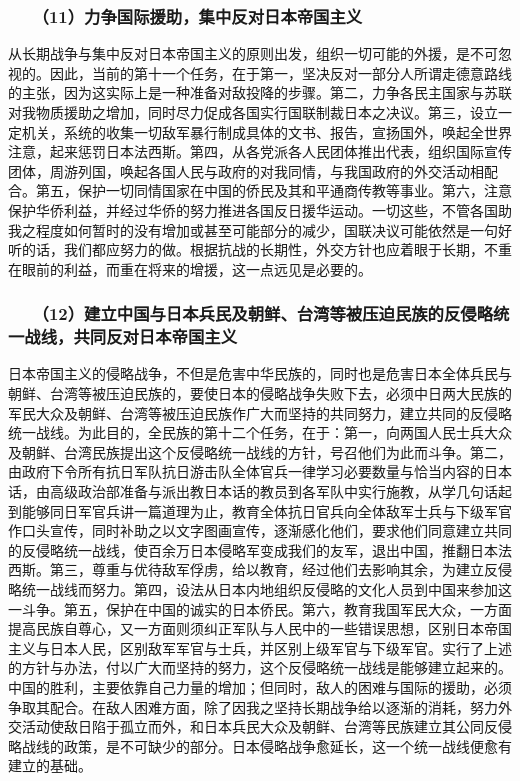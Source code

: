\documentclass[cn,11pt,chinese]{elegantbook}
\def\myformat#1{\hfil\hfil #1}
\begin{document}
\subsubsection*{\myformat{　　（11）力争国际援助，集中反对日本帝国主义}}
从长期战争与集中反对日本帝国主义的原则出发，组织一切可能的外援，是不可忽视的。因此，当前的第十一个任务，在于第一，坚决反对一部分人所谓走德意路线的主张，因为这实际上是一种准备对敌投降的步骤。第二，力争各民主国家与苏联对我物质援助之增加，同时尽力促成各国实行国联制裁日本之决议。第三，设立一定机关，系统的收集一切敌军暴行制成具体的文书、报告，宣扬国外，唤起全世界注意，起来惩罚日本法西斯。第四，从各党派各人民团体推出代表，组织国际宣传团体，周游列国，唤起各国人民与政府的对我同情，与我国政府的外交活动相配合。第五，保护一切同情国家在中国的侨民及其和平通商传教等事业。第六，注意保护华侨利益，并经过华侨的努力推进各国反日援华运动。一切这些，不管各国助我之程度如何暂时的没有增加或甚至可能部分的减少，国联决议可能依然是一句好听的话，我们都应努力的做。根据抗战的长期性，外交方针也应着眼于长期，不重在眼前的利益，而重在将来的增援，这一点远见是必要的。\\
\subsubsection*{\myformat{　　（12）建立中国与日本兵民及朝鲜、台湾等被压迫民族的反侵略统一战线，共同反对日本帝国主义}}
日本帝国主义的侵略战争，不但是危害中华民族的，同时也是危害日本全体兵民与朝鲜、台湾等被压迫民族的，要使日本的侵略战争失败下去，必须中日两大民族的军民大众及朝鲜、台湾等被压迫民族作广大而坚持的共同努力，建立共同的反侵略统一战线。为此目的，全民族的第十二个任务，在于：第一，向两国人民士兵大众及朝鲜、台湾民族提出这个反侵略统一战线的方针，号召他们为此而斗争。第二，由政府下令所有抗日军队抗日游击队全体官兵一律学习必要数量与恰当内容的日本话，由高级政治部准备与派出教日本话的教员到各军队中实行施教，从学几句话起到能够同日军官兵讲一篇道理为止，教育全体抗日官兵向全体敌军士兵与下级军官作口头宣传，同时补助之以文字图画宣传，逐渐感化他们，要求他们同意建立共同的反侵略统一战线，使百余万日本侵略军变成我们的友军，退出中国，推翻日本法西斯。第三，尊重与优待敌军俘虏，给以教育，经过他们去影响其余，为建立反侵略统一战线而努力。第四，设法从日本内地组织反侵略的文化人员到中国来参加这一斗争。第五，保护在中国的诚实的日本侨民。第六，教育我国军民大众，一方面提高民族自尊心，又一方面则须纠正军队与人民中的一些错误思想，区别日本帝国主义与日本人民，区别敌军军官与士兵，并区别上级军官与下级军官。实行了上述的方针与办法，付以广大而坚持的努力，这个反侵略统一战线是能够建立起来的。中国的胜利，主要依靠自己力量的增加；但同时，敌人的困难与国际的援助，必须争取其配合。在敌人困难方面，除了因我之坚持长期战争给以逐渐的消耗，努力外交活动使敌日陷于孤立而外，和日本兵民大众及朝鲜、台湾等民族建立其公同反侵略战线的政策，是不可缺少的部分。日本侵略战争愈延长，这一个统一战线便愈有建立的基础。\\
\end{document}
